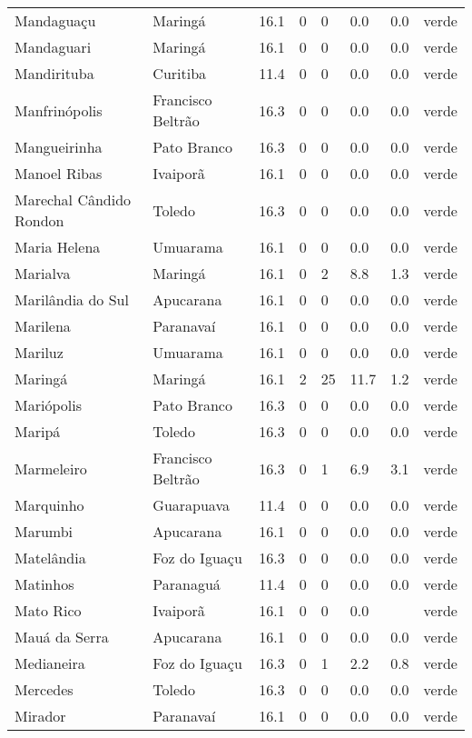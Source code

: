 \begin{longtable}{l|lllllll}
  Mandaguaçu & Maringá & 16.1 & 0 & 0 & 0.0 & 0.0 & verde \\ 
  Mandaguari & Maringá & 16.1 & 0 & 0 & 0.0 & 0.0 & verde \\ 
  Mandirituba & Curitiba & 11.4 & 0 & 0 & 0.0 & 0.0 & verde \\ 
  Manfrinópolis & Francisco Beltrão & 16.3 & 0 & 0 & 0.0 & 0.0 & verde \\ 
  Mangueirinha & Pato Branco & 16.3 & 0 & 0 & 0.0 & 0.0 & verde \\ 
  Manoel Ribas & Ivaiporã & 16.1 & 0 & 0 & 0.0 & 0.0 & verde \\ 
  Marechal Cândido Rondon & Toledo & 16.3 & 0 & 0 & 0.0 & 0.0 & verde \\ 
  Maria Helena & Umuarama & 16.1 & 0 & 0 & 0.0 & 0.0 & verde \\ 
  Marialva & Maringá & 16.1 & 0 & 2 & 8.8 & 1.3 & verde \\ 
  Marilândia do Sul & Apucarana & 16.1 & 0 & 0 & 0.0 & 0.0 & verde \\ 
  Marilena & Paranavaí & 16.1 & 0 & 0 & 0.0 & 0.0 & verde \\ 
  Mariluz & Umuarama & 16.1 & 0 & 0 & 0.0 & 0.0 & verde \\ 
  Maringá & Maringá & 16.1 & 2 & 25 & 11.7 & 1.2 & verde \\ 
  Mariópolis & Pato Branco & 16.3 & 0 & 0 & 0.0 & 0.0 & verde \\ 
  Maripá & Toledo & 16.3 & 0 & 0 & 0.0 & 0.0 & verde \\ 
  Marmeleiro & Francisco Beltrão & 16.3 & 0 & 1 & 6.9 & 3.1 & verde \\ 
  Marquinho & Guarapuava & 11.4 & 0 & 0 & 0.0 & 0.0 & verde \\ 
  Marumbi & Apucarana & 16.1 & 0 & 0 & 0.0 & 0.0 & verde \\ 
  Matelândia & Foz do Iguaçu & 16.3 & 0 & 0 & 0.0 & 0.0 & verde \\ 
  Matinhos & Paranaguá & 11.4 & 0 & 0 & 0.0 & 0.0 & verde \\ 
  Mato Rico & Ivaiporã & 16.1 & 0 & 0 & 0.0 &  & verde \\ 
  Mauá da Serra & Apucarana & 16.1 & 0 & 0 & 0.0 & 0.0 & verde \\ 
  Medianeira & Foz do Iguaçu & 16.3 & 0 & 1 & 2.2 & 0.8 & verde \\ 
  Mercedes & Toledo & 16.3 & 0 & 0 & 0.0 & 0.0 & verde \\ 
  Mirador & Paranavaí & 16.1 & 0 & 0 & 0.0 & 0.0 & verde \\ 

\end{longtable}
